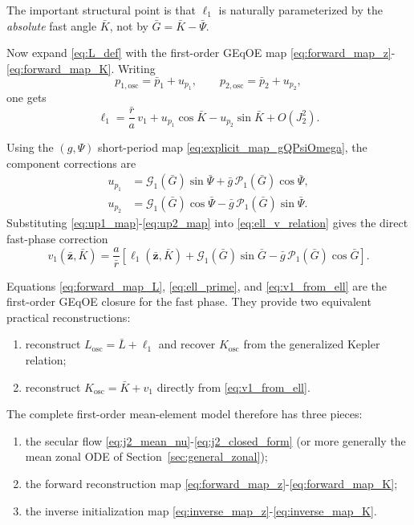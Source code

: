 \documentclass[11pt]{article}
\begin{document}
The important structural point is that $\ell_1$ is naturally parameterized by
the \emph{absolute} fast angle $\bar K$, not by
$\bar G = \bar K - \bar\Psi$.

Now expand \eqref{eq:L_def} with the first-order GEqOE map
\eqref{eq:forward_map_z}-\eqref{eq:forward_map_K}. Writing
\begin{equation}
p_{1,\mathrm{osc}} = \bar p_1 + u_{p_1},
\qquad
p_{2,\mathrm{osc}} = \bar p_2 + u_{p_2},
\end{equation}
one gets
\begin{equation}
\ell_1
= \frac{\bar r}{a}\,v_1
+ u_{p_1}\cos\bar K
- u_{p_2}\sin\bar K
+ O(J_2^2).
\label{eq:ell_v_relation}
\end{equation}

Using the $(g,\Psi)$ short-period map
\eqref{eq:explicit_map_gQPsiOmega}, the component corrections are
\begin{align}
u_{p_1}
&= \mathcal G_1(\bar G)\sin\bar\Psi
+ \bar g\,\mathcal P_1(\bar G)\cos\bar\Psi,
\label{eq:up1_map}\\
u_{p_2}
&= \mathcal G_1(\bar G)\cos\bar\Psi
- \bar g\,\mathcal P_1(\bar G)\sin\bar\Psi.
\label{eq:up2_map}
\end{align}
Substituting \eqref{eq:up1_map}-\eqref{eq:up2_map} into
\eqref{eq:ell_v_relation} gives the direct fast-phase correction
\begin{equation}
v_1(\bar{\bm z},\bar K)
= \frac{a}{\bar r}
\left[
\ell_1(\bar{\bm z},\bar K)
+ \mathcal G_1(\bar G)\sin\bar G
- \bar g\,\mathcal P_1(\bar G)\cos\bar G
\right].
\label{eq:v1_from_ell}
\end{equation}

Equations \eqref{eq:forward_map_L}, \eqref{eq:ell_prime}, and
\eqref{eq:v1_from_ell} are the first-order GEqOE closure for the fast
phase. They provide two equivalent practical reconstructions:
\begin{enumerate}
    \item reconstruct $L_{\mathrm{osc}} = \bar L + \ell_1$ and recover
    $K_{\mathrm{osc}}$ from the generalized Kepler relation;
    \item reconstruct $K_{\mathrm{osc}} = \bar K + v_1$ directly from
    \eqref{eq:v1_from_ell}.
\end{enumerate}

The complete first-order mean-element model therefore has three pieces:
\begin{enumerate}
    \item the secular flow
    \eqref{eq:j2_mean_nu}-\eqref{eq:j2_closed_form} (or more generally the
    mean zonal ODE of Section~\ref{sec:general_zonal});
    \item the forward reconstruction map
    \eqref{eq:forward_map_z}-\eqref{eq:forward_map_K};
    \item the inverse initialization map
    \eqref{eq:inverse_map_z}-\eqref{eq:inverse_map_K}.
\end{enumerate}
\end{document}
